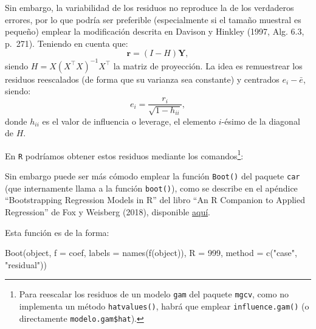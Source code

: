 \documentclass[
]{book}
\newenvironment{Shaded}{\begin{snugshade}}{\end{snugshade}}
\newcommand{\AttributeTok}[1]{\textcolor[rgb]{0.77,0.63,0.00}{#1}}
\newcommand{\DecValTok}[1]{\textcolor[rgb]{0.00,0.00,0.81}{#1}}
\newcommand{\FunctionTok}[1]{\textcolor[rgb]{0.00,0.00,0.00}{#1}}
\newcommand{\NormalTok}[1]{#1}
\newcommand{\OtherTok}[1]{\textcolor[rgb]{0.56,0.35,0.01}{#1}}
\newcommand{\SpecialCharTok}[1]{\textcolor[rgb]{0.00,0.00,0.00}{#1}}
\newcommand{\StringTok}[1]{\textcolor[rgb]{0.31,0.60,0.02}{#1}}
\theoremstyle{break}
\theoremstyle{nonumberplain}
\begin{document}
Sin embargo, la variabilidad de los residuos no reproduce la de los verdaderos errores, por lo que podría ser preferible (especialmente si el tamaño muestral es pequeño) emplear la modificación descrita en Davison y Hinkley (1997, Alg. 6.3, p.~271).
Teniendo en cuenta que:
\[\mathbf{r} = \left( I - H \right)\mathbf{Y},\]
siendo \(H = X\left( X^{\top}X\right)^{-1}X^{\top}\) la matriz de proyección.
La idea es remuestrear los residuos reescalados (de forma que su varianza sea constante) y centrados \(e_i - \bar{e}\), siendo:
\[e_i = \frac{r_i}{\sqrt{1 - h_{ii}}},\]
donde \(h_{ii}\) es el valor de influencia o leverage, el elemento \(i\)-ésimo de la diagonal de \(H\).

En \texttt{R} podríamos obtener estos residuos mediante los comandos\footnote{Para reescalar los
  residuos de un modelo \texttt{gam} del paquete \texttt{mgcv}, como no implementa un método \texttt{hatvalues()},
  habrá que emplear \texttt{influence.gam()} (o directamente \texttt{modelo.gam\$hat}).}:

\begin{Shaded}
\end{Shaded}

Sin embargo puede ser más cómodo emplear la función \texttt{Boot()} del paquete \texttt{car} (que internamente llama a la función \texttt{boot()}),
como se describe en el apéndice ``Bootstrapping Regression Models in R'' del libro ``An R Companion to Applied Regression'' de Fox y Weisberg (2018), disponible \href{https://socialsciences.mcmaster.ca/jfox/Books/Companion/appendices/Appendix-Bootstrapping.pdf}{aquí}.

Esta función es de la forma:

\begin{Shaded}
\begin{Highlighting}[]
\FunctionTok{Boot}\NormalTok{(object, }\AttributeTok{f =}\NormalTok{ coef, }\AttributeTok{labels =} \FunctionTok{names}\NormalTok{(}\FunctionTok{f}\NormalTok{(object)), }\AttributeTok{R =} \DecValTok{999}\NormalTok{, }
     \AttributeTok{method =} \FunctionTok{c}\NormalTok{(}\StringTok{"case"}\NormalTok{, }\StringTok{"residual"}\NormalTok{))}
\end{Highlighting}
\end{Shaded}
\end{document}
